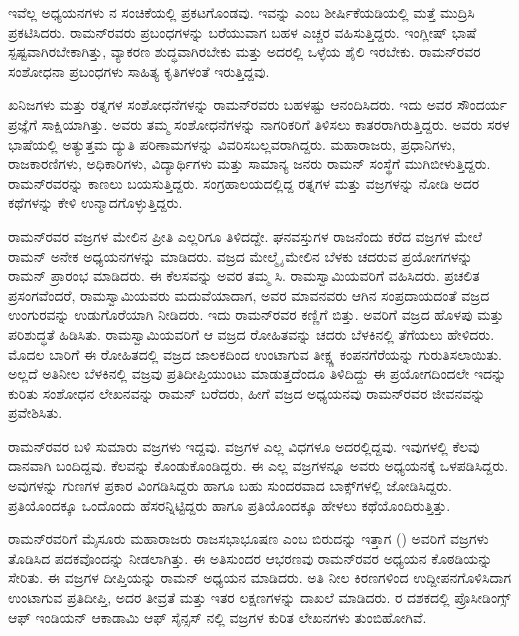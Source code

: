 ಇವೆಲ್ಲ ಅಧ್ಯಯನಗಳು \textit{}ನ ಸಂಚಿಕೆಯಲ್ಲಿ ಪ್ರಕಟಗೊಂಡವು. ಇವನ್ನು \textit{} ಎಂಬ ಶೀರ್ಷಿಕೆಯಡಿಯಲ್ಲಿ ಮತ್ತೆ ಮುದ್ರಿಸಿ ಪ್ರಕಟಿಸಿದರು. ರಾಮನ್‍ರವರು ಪ್ರಬಂಧಗಳನ್ನು ಬರೆಯುವಾಗ ಬಹಳ ಎಚ್ಚರ ವಹಿಸುತ್ತಿದ್ದರು. ಇಂಗ್ಲೀಷ್ ಭಾಷೆ ಸ್ಪಷ್ಟವಾಗಿರಬೇಕಾಗಿತ್ತು, ವ್ಯಾಕರಣ ಶುದ್ಧವಾಗಿರಬೇಕು ಮತ್ತು ಅದರಲ್ಲಿ ಒಳ್ಳೆಯ ಶೈಲಿ ಇರಬೇಕು. ರಾಮನ್‍ರವರ ಸಂಶೋಧನಾ ಪ್ರಬಂಧಗಳು ಸಾಹಿತ್ಯ ಕೃತಿಗಳಂತೆ ಇರುತ್ತಿದ್ದವು.

ಖನಿಜಗಳು ಮತ್ತು ರತ್ನಗಳ ಸಂಶೋಧನೆಗಳನ್ನು ರಾಮನ್‍ರವರು ಬಹಳಷ್ಟು ಆನಂದಿಸಿದರು. ಇದು ಅವರ ಸೌಂದರ್ಯ ಪ್ರಜ್ಞೆಗೆ ಸಾಕ್ಷಿಯಾಗಿತ್ತು. ಅವರು ತಮ್ಮ ಸಂಶೋಧನೆಗಳನ್ನು ನಾಗರಿಕರಿಗೆ ತಿಳಿಸಲು ಕಾತರರಾಗಿರುತ್ತಿದ್ದರು. ಅವರು ಸರಳ ಭಾಷೆಯಲ್ಲಿ ಅತ್ಯುತ್ತಮ ದ್ಯುತಿ ಪರಿಣಾಮಗಳನ್ನು ವಿವರಿಸಬಲ್ಲವರಾಗಿದ್ದರು. ಮಹಾರಾಜರು, ಪ್ರಧಾನಿಗಳು, ರಾಜಕಾರಣಿಗಳು, ಅಧಿಕಾರಿಗಳು, ವಿದ್ಯಾರ್ಥಿಗಳು ಮತ್ತು ಸಾಮಾನ್ಯ ಜನರು ರಾಮನ್ ಸಂಸ್ಥೆಗೆ ಮುಗಿಬೀಳುತ್ತಿದ್ದರು. ರಾಮನ್‍ರವರನ್ನು ಕಾಣಲು ಬಯಸುತ್ತಿದ್ದರು. ಸಂಗ್ರಹಾಲಯದಲ್ಲಿದ್ದ ರತ್ನಗಳ ಮತ್ತು ವಜ್ರಗಳನ್ನು ನೋಡಿ ಅದರ ಕಥೆಗಳನ್ನು ಕೇಳಿ ಉನ್ಮಾದಗೊಳ್ಳುತ್ತಿದ್ದರು.



ರಾಮನ್‍ರವರ ವಜ್ರಗಳ ಮೇಲಿನ ಪ್ರೀತಿ ಎಲ್ಲರಿಗೂ ತಿಳಿದದ್ದೇ. ಘನವಸ್ತುಗಳ ರಾಜನೆಂದು ಕರೆದ ವಜ್ರಗಳ ಮೇಲೆ ರಾಮನ್ ಅನೇಕ ಅಧ್ಯಯನಗಳನ್ನು ಮಾಡಿದರು. ವಜ್ರದ ಮೇಲ್ಮೈ ಮೇಲಿನ ಬೆಳಕು ಚದರುವ ಪ್ರಯೋಗಗಳನ್ನು ರಾಮನ್ ಪ್ರಾರಂಭ ಮಾಡಿದರು. ಈ ಕೆಲಸವನ್ನು ಅವರ ತಮ್ಮ ಸಿ. ರಾಮಸ್ವಾಮಿಯವರಿಗೆ ವಹಿಸಿದರು. ಪ್ರಚಲಿತ ಪ್ರಸಂಗವೆಂದರೆ, ರಾಮಸ್ವಾಮಿಯವರು ಮದುವೆಯಾದಾಗ, ಅವರ ಮಾವನವರು ಆಗಿನ ಸಂಪ್ರದಾಯದಂತೆ ವಜ್ರದ ಉಂಗುರವನ್ನು ಉಡುಗೊರೆಯಾಗಿ ನೀಡಿದರು. ಇದು ರಾಮನ್‍ರವರ ಕಣ್ಣಿಗೆ ಬಿತ್ತು. ಅವರಿಗೆ ವಜ್ರದ ಹೊಳಪು ಮತ್ತು ಪರಿಶುದ್ಧತೆ ಹಿಡಿಸಿತು. ರಾಮಸ್ವಾಮಿಯವರಿಗೆ ಆ ವಜ್ರದ ರೋಹಿತವನ್ನು ಚದರು ಬೆಳಕಿನಲ್ಲಿ ತೆಗೆಯಲು ಹೇಳಿದರು. ಮೊದಲ ಬಾರಿಗೆ ಈ ರೋಹಿತದಲ್ಲಿ ವಜ್ರದ ಜಾಲಕದಿಂದ ಉಂಟಾಗುವ ತೀಕ್ಷ್ಣ ಕಂಪನಗೆರೆಯನ್ನು ಗುರುತಿಸಲಾಯಿತು. ಅಲ್ಲದೆ ಅತಿನೀಲ ಬೆಳಕಿನಲ್ಲಿ ವಜ್ರವು ಪ್ರತಿದೀಪ್ತಿಯುಂಟು ಮಾಡುತ್ತದೆಂದೂ ತಿಳಿದಿದ್ದು ಈ ಪ್ರಯೋಗದಿಂದಲೇ ಇದನ್ನು ಕುರಿತು ಸಂಶೋಧನ ಲೇಖನವನ್ನು ರಾಮನ್ ಬರೆದರು, ಹೀಗೆ ವಜ್ರದ ಅಧ್ಯಯನವು ರಾಮನ್‍ರವರ ಜೀವನವನ್ನು ಪ್ರವೇಶಿಸಿತು.

ರಾಮನ್‍ರವರ ಬಳಿ ಸುಮಾರು  ವಜ್ರಗಳು ಇದ್ದವು. ವಜ್ರಗಳ ಎಲ್ಲ ವಿಧಗಳೂ ಅದರಲ್ಲಿದ್ದವು. ಇವುಗಳಲ್ಲಿ ಕೆಲವು ದಾನವಾಗಿ ಬಂದಿದ್ದವು. ಕೆಲವನ್ನು ಕೊಂಡುಕೊಂಡಿದ್ದರು. ಈ ಎಲ್ಲ ವಜ್ರಗಳನ್ನೂ ಅವರು ಅಧ್ಯಯನಕ್ಕೆ ಒಳಪಡಿಸಿದ್ದರು. ಅವುಗಳನ್ನು ಗುಣಗಳ ಪ್ರಕಾರ ವಿಂಗಡಿಸಿದ್ದರು ಹಾಗೂ ಬಹು ಸುಂದರವಾದ ಬಾಕ್ಸ್‌ಗಳಲ್ಲಿ ಜೋಡಿಸಿದ್ದರು. ಪ್ರತಿಯೊಂದಕ್ಕೂ ಒಂದೊಂದು ಹೆಸರನ್ನಿಟ್ಟಿದ್ದರು ಹಾಗೂ ಪ್ರತಿಯೊಂದಕ್ಕೂ ಹೇಳಲು ಕಥೆಯೊಂದಿರುತ್ತಿತ್ತು.

ರಾಮನ್‍ರವರಿಗೆ ಮೈಸೂರು ಮಹಾರಾಜರು ರಾಜಸಭಾಭೂಷಣ ಎಂಬ ಬಿರುದನ್ನು ಇತ್ತಾಗ () ಅವರಿಗೆ  ವಜ್ರಗಳು ತೊಡಿಸಿದ ಪದಕವೊಂದನ್ನು ನೀಡಲಾಗಿತ್ತು. ಈ ಅತಿಸುಂದರ ಆಭರಣವು ರಾಮನ್‍ರವರ ಅಧ್ಯಯನ ಕೊಠಡಿಯನ್ನು ಸೇರಿತು. ಈ  ವಜ್ರಗಳ ದೀಪ್ತಿಯನ್ನು ರಾಮನ್ ಅಧ್ಯಯನ ಮಾಡಿದರು. ಅತಿ ನೀಲ ಕಿರಣಗಳಿಂದ ಉದ್ದೀಪನಗೊಳಿಸಿದಾಗ ಉಂಟಾಗುವ ಪ್ರತಿದೀಪ್ತಿ, ಅದರ ತೀವ್ರತೆ ಮತ್ತು ಇತರ ಲಕ್ಷಣಗಳನ್ನು ದಾಖಲೆ ಮಾಡಿದರು. ರ ದಶಕದಲ್ಲಿ ಪ್ರೊಸೀಡಿಂಗ್ಸ್ ಆಫ್ ಇಂಡಿಯನ್ ಆಕಾಡಾಮಿ ಆಫ್ ಸೈನ್ಸ‌ಸ್ \textit{}ನಲ್ಲಿ ವಜ್ರಗಳ ಕುರಿತ ಲೇಖನಗಳು ತುಂಬಿಹೋಗಿವೆ. 

